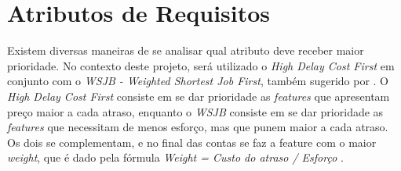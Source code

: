 \section{Atributos de Requisitos}

Existem diversas maneiras de se analisar qual atributo deve receber maior prioridade. No contexto deste projeto, será utilizado o \emph{High Delay Cost First} em conjunto com o \emph{WSJB - Weighted Shortest Job First}, também sugerido por \cite{safe001}. O \emph{High Delay Cost First} consiste em se dar prioridade as \emph{features} que apresentam preço maior a cada atraso, enquanto o \emph{WSJB} consiste em se dar prioridade as \emph{features} que necessitam de menos esforço, mas que punem maior a cada atraso. Os dois se complementam, e no final das contas se faz a feature com o maior \emph{weight}, que é dado pela fórmula \emph{Weight = Custo do atraso / Esforço} \cite[p. 266]{safe001}.